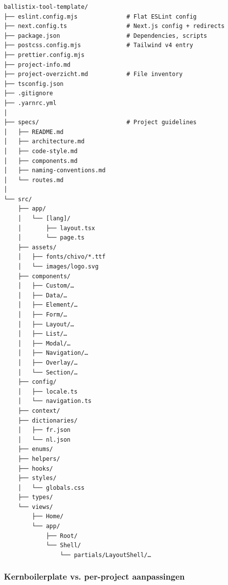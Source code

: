 \begin{verbatim}
ballistix-tool-template/
├── eslint.config.mjs              # Flat ESLint config
├── next.config.ts                 # Next.js config + redirects
├── package.json                   # Dependencies, scripts
├── postcss.config.mjs             # Tailwind v4 entry
├── prettier.config.mjs
├── project-info.md
├── project-overzicht.md           # File inventory
├── tsconfig.json
├── .gitignore
├── .yarnrc.yml
│
├── specs/                         # Project guidelines
│   ├── README.md
│   ├── architecture.md
│   ├── code-style.md
│   ├── components.md
│   ├── naming-conventions.md
│   └── routes.md
│
└── src/
    ├── app/
    │   └── [lang]/
    │       ├── layout.tsx
    │       └── page.ts
    ├── assets/
    │   ├── fonts/chivo/*.ttf
    │   └── images/logo.svg
    ├── components/
    │   ├── Custom/…
    │   ├── Data/…
    │   ├── Element/…
    │   ├── Form/…
    │   ├── Layout/…
    │   ├── List/…
    │   ├── Modal/…
    │   ├── Navigation/…
    │   ├── Overlay/…
    │   └── Section/…
    ├── config/
    │   ├── locale.ts
    │   └── navigation.ts
    ├── context/
    ├── dictionaries/
    │   ├── fr.json
    │   └── nl.json
    ├── enums/
    ├── helpers/
    ├── hooks/
    ├── styles/
    │   └── globals.css
    ├── types/
    └── views/
        ├── Home/
        └── app/
            ├── Root/
            └── Shell/
                └── partials/LayoutShell/…
\end{verbatim}

\subsubsection{Kernboilerplate vs. per-project aanpassingen}


